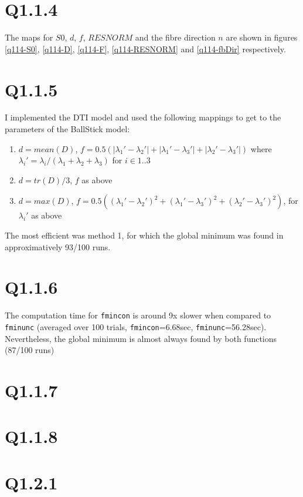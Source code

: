 \documentclass[11pt,a4paper,oneside]{report}
\begin{document}
\section*{Q1.1.4}

The maps for $S0$, $d$, $f$, $RESNORM$ and the fibre direction $n$ are shown in figures \ref{q114-S0}, \ref{q114-D}, \ref{q114-F}, \ref{q114-RESNORM} and \ref{q114-fbDir} respectively. 

\section*{Q1.1.5}

I implemented the DTI model and used the following mappings to get to the parameters of the BallStick model:
\begin{enumerate}
 \item $d = mean(D)$, $f = 0.5 ( |\lambda_1'- \lambda_2'| + |\lambda_1'- \lambda_3'| + |\lambda_2'- \lambda_3'|) $ where $\lambda_i' = \lambda_i/(\lambda_1 + \lambda_2 + \lambda_3)$ for $i \in 1..3$
 \item $d = tr(D)/3$, $f$ as above
 \item $d = max(D)$,  $f = 0.5 ( (\lambda_1'- \lambda_2')^2 + (\lambda_1'- \lambda_3')^2 + (\lambda_2'- \lambda_3')^2) $, for $\lambda_i'$ as above
\end{enumerate}

The most efficient was method 1, for which the global minimum was found in approximatively 93/100 runs.



\section*{Q1.1.6}

The computation time for \texttt{fmincon} is around 9x slower when compared to \texttt{fminunc} (averaged over 100 trials, \texttt{fmincon}=6.68sec, \texttt{fminunc}=56.28sec). Nevertheless, the global minimum is almost always found by both functions (87/100 runs)

\section*{Q1.1.7}


\section*{Q1.1.8}

\section*{Q1.2.1}
\end{document}
